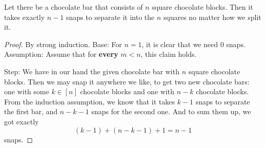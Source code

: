 \begin{example} 
  Let there be a chocolate bar that consists of \(n\) square chocolate blocks. Then it takes exactly \(n - 1\) snaps to separate it into the \(n\) squares no matter how we split it.

  \begin{proof} By strong induction. Base: For \(n = 1\), it is clear that we need \(0\) snaps. Assumption: Assume that for \textbf{every} \(m < n \), this claim holds.


Step: We have in our hand the given chocolate bar with \(n\) square chocolate blocks. Then we may snap it anywhere we like, to get two new chocolate bars: one with some \( k \in [n]\) chocolate blocks and one with \(n - k\) chocolate blocks. From the induction assumption, we know that it takes \(k - 1\) snaps to separate the first bar, and \(n - k - 1\) snaps for the second one. And to sum them up, we got exactly \[ (k - 1) + (n - k - 1) + 1 = n - 1 \] snaps.
\end{proof}
\end{example}
